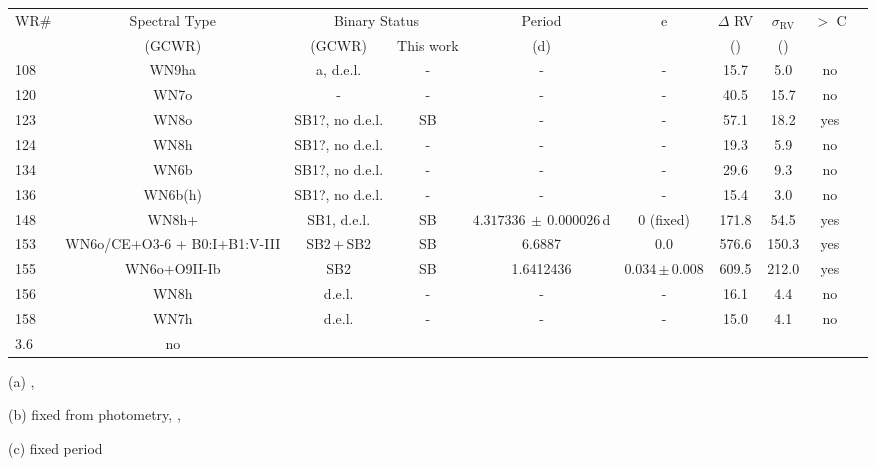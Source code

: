 \begin{table}
\begin{threeparttable}
\begin{tabular*}{\textwidth}{l @{\extracolsep{\fill}}*{9}{c}}
WR\# & Spectral Type & \multicolumn{2}{c}{Binary Status} & Period & e & $\Delta$ RV  & $\sigma_{\textrm{RV}}$ & \DelRV{} $>$ C\\ 
 & (GCWR) & (GCWR) & This work & (d) & &(\kms{}) &(\kms{}) &  \\ \midrule 
108 & WN9ha & a, d.e.l. & - & - & - & 15.7 & 5.0 & no\\
120 & WN7o & - & - & - & - & 40.5 & 15.7 & no\\
123 & WN8o & SB1?, no d.e.l. & SB & - & - & 57.1 & 18.2 & yes\\
124 & WN8h & SB1?, no d.e.l. & - & - & - & 19.3 & 5.9 & no\\
134 & WN6b & SB1?, no d.e.l. & - & - & - & 29.6 & 9.3 & no\\
136 & WN6b(h) & SB1?, no d.e.l. & - & - & - & 15.4 & 3.0 & no\\
148 & WN8h+ & SB1, d.e.l. & SB & $4.317336\,\pm\,0.000026\,$d\tnote{(a)} & 0 (fixed)\tnote{(a)} & 171.8 & 54.5 & yes\\
153 & WN6o/CE+O3-6 + B0:I+B1:V-III  & SB2\,+\,SB2 & SB & 6.6887\tnote{(b)} & 0.0\tnote{(b)} & 576.6 & 150.3 & yes\\
155 & WN6o+O9II-Ib & SB2 & SB & 1.6412436\tnote{(c)} & 0.034\,$\pm$\,0.008\tnote{(c)} & 609.5 & 212.0 & yes\\
156 & WN8h & d.e.l. & - & - & - & 16.1 & 4.4 & no\\
158 & WN7h & d.e.l. & - & - & - & 15.0 & 4.1 & no\\3.6 & no\\
\bottomrule
\end{tabular*}
\begin{tablenotes}[para]
    \item[(a)] \citep{munoz_wr_2017},
    \item[(b)] fixed from photometry, \citet{demers_quadruple_2002},
    \item[(c)] \citet{marchenko_wind-wind_1995} fixed period
\end{tablenotes}
\end{threeparttable}
\label{tab:WNL_data}
\end{table}

